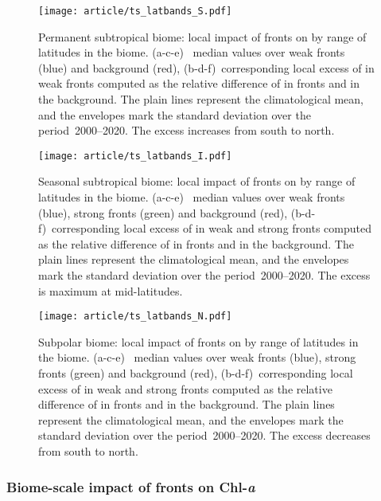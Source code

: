 \begin{figure}
  \centering
  \texttt{[image: article/ts\_latbands\_S.pdf]}
  \caption[Local impact of front on  in the permanent subtropical biome]{%
    Permanent subtropical biome: local impact of fronts on  by range of latitudes in the biome.
    (a-c-e)~ median values over weak fronts (blue) and background (red), (b-d-f)~corresponding local excess of  in weak fronts computed as the relative difference of  in fronts and in the background.
    The plain lines represent the climatological mean, and the envelopes mark the standard deviation over the period~2000--2020.
    The excess increases from south to north.
  }%
  \label{fig:latbands-s}
\end{figure}

\begin{figure}
  \centering
  \texttt{[image: article/ts\_latbands\_I.pdf]}
  \caption[Local impact of front on  in the seasonal subtropical biome]{%
    Seasonal subtropical biome: local impact of fronts on   by range of latitudes in the biome.
    (a-c-e)~ median values over weak fronts (blue), strong fronts (green) and background (red), (b-d-f)~corresponding local excess of  in weak and strong fronts computed as the relative difference of  in fronts and in the background.
    The plain lines represent the climatological mean, and the envelopes mark the standard deviation over the period~2000--2020.
    The excess is maximum at mid-latitudes.
  }%
  \label{fig:latbands-i}
\end{figure}

\begin{figure}
  \centering
  \texttt{[image: article/ts\_latbands\_N.pdf]}
  \caption[Local impact of front on  in the subpolar biome]{
    Subpolar biome: local impact of fronts on   by range of latitudes in the biome.
    (a-c-e)~ median values over weak fronts (blue), strong fronts (green) and background (red), (b-d-f)~corresponding local excess of  in weak and strong fronts computed as the relative difference of  in fronts and in the background.
    The plain lines represent the climatological mean, and the envelopes mark the standard deviation over the period~2000--2020.
    The excess decreases from south to north.
  }%
  \label{fig:latbands-n}
\end{figure}


\subsubsection{Biome-scale impact of fronts on Chl-\textit{a}}

